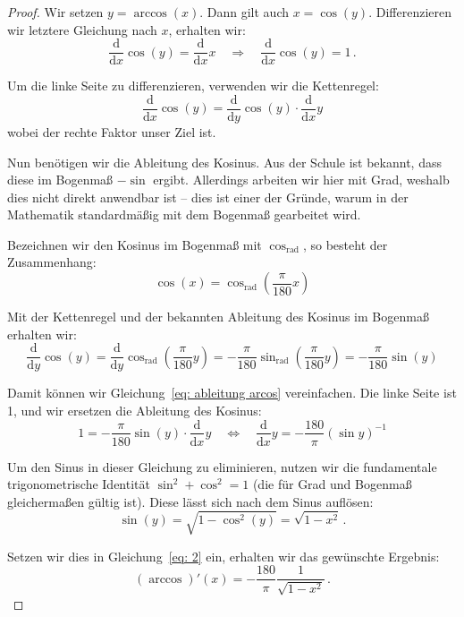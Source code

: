 \begin{proof}
	Wir setzen $y=\arccos(x)$. Dann gilt auch $x=\cos(y)$. Differenzieren wir letztere Gleichung nach $x$, erhalten wir:
	\begin{equation*}
		\frac{\mathrm{d}}{\mathrm{d}x}\cos(y)=\frac{\mathrm{d}}{\mathrm{d}x}x \quad \Rightarrow \quad \frac{\mathrm{d}}{\mathrm{d}x}\cos(y)=1\,.
	\end{equation*}
	
	Um die linke Seite zu differenzieren, verwenden wir die Kettenregel:
	\begin{equation}\label{eq: ableitung arcos}
		\frac{\mathrm{d}}{\mathrm{d}x}\cos(y)=\frac{\mathrm{d}}{\mathrm{d}y}\cos(y) \cdot \frac{\mathrm{d}}{\mathrm{d}x}y
	\end{equation}
	wobei der rechte Faktor unser Ziel ist.
	
	Nun benötigen wir die Ableitung des Kosinus. Aus der Schule ist bekannt, dass diese im Bogenmaß $-\sin$ ergibt. Allerdings arbeiten wir hier mit Grad, weshalb dies nicht direkt anwendbar ist – dies ist einer der Gründe, warum in der Mathematik standardmäßig mit dem Bogenmaß gearbeitet wird.
	
	Bezeichnen wir den Kosinus im Bogenmaß mit $\cos_{\text{rad}}$, so besteht der Zusammenhang:
	$$\cos(x)=\cos_{\text{rad}}\left(\frac{\pi}{180}x\right)$$
	
	Mit der Kettenregel und der bekannten Ableitung des Kosinus im Bogenmaß erhalten wir:
	\begin{equation*}
		\frac{\mathrm{d}}{\mathrm{d}y}\cos(y)=\frac{\mathrm{d}}{\mathrm{d}y}\cos_{\text{rad}}\left(\frac{\pi}{180}y\right)=-\frac{\pi}{180}\sin_{\text{rad}}\left(\frac{\pi}{180}y\right)=-\frac{\pi}{180}\sin(y)
	\end{equation*}
	
	Damit können wir Gleichung~\eqref{eq: ableitung arcos} vereinfachen. Die linke Seite ist 1, und wir ersetzen die Ableitung des Kosinus:
	\begin{equation}\label{eq: 2}
		1=-\frac{\pi}{180}\sin(y) \cdot \frac{\mathrm{d}}{\mathrm{d}x}y \quad \Leftrightarrow \quad \frac{\mathrm{d}}{\mathrm{d}x}y=-\frac{180}{\pi}(\sin y)^{-1}
	\end{equation}
	
	Um den Sinus in dieser Gleichung zu eliminieren, nutzen wir die fundamentale trigonometrische Identität $\sin^2 + \cos^2 = 1$ (die für Grad und Bogenmaß gleichermaßen gültig ist). Diese lässt sich nach dem Sinus auflösen:
	\begin{equation*}
		\sin(y)=\sqrt{1-\cos^2(y)}=\sqrt{1-x^2}\,.
	\end{equation*}
	
	Setzen wir dies in Gleichung~\eqref{eq: 2} ein, erhalten wir das gewünschte Ergebnis:
	\begin{equation*}
		(\arccos)'(x)=-\frac{180}{\pi}\frac{1}{\sqrt{1-x^2}}\,.
	\end{equation*}
\end{proof}

